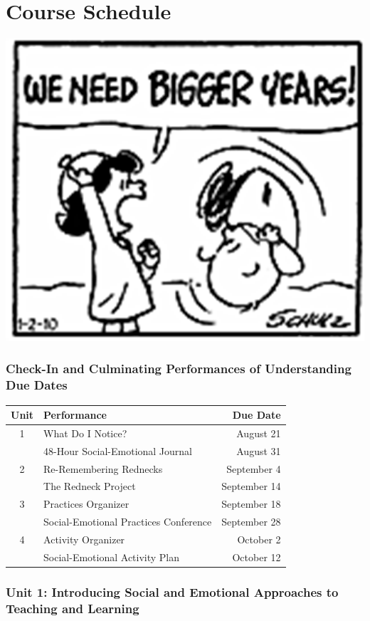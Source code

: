 \documentclass[two-side]{tufte-handout}
\begin{document}
\newpage

\part{\faCalendar\medspace Course Schedule \medspace\faCalendar}

\begin{marginfigure}
	\begin{center}
		\includegraphics[width=0.4\linewidth]{sc-pic.png}
	\end{center}
\end{marginfigure}

\medskip

\section{Check-In and Culminating Performances of Understanding Due Dates}
\begin{tabular}{clr}
	\toprule
	Unit & Performance & Due Date \\
	\midrule\midrule
	1 & What Do I Notice? & August 21 \\
	& 48-Hour Social-Emotional Journal & August 31 \\
	\midrule
	2 & Re-Remembering Rednecks & September 4 \\
	& The Redneck Project & September 14 \\
	\midrule
	3 & Practices Organizer & September 18 \\
	& Social-Emotional Practices Conference & September 28 \\
	\midrule
	4 & Activity Organizer & October 2 \\
	& Social-Emotional Activity Plan & October 12 \\
	\bottomrule
\end{tabular}

	\section{Unit 1: Introducing Social and Emotional Approaches to Teaching and Learning}
\end{document}

